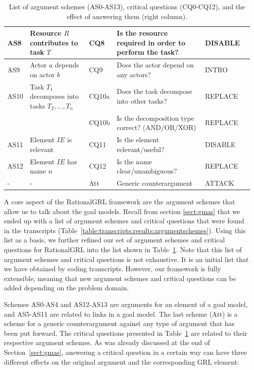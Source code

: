 \begin{table}[t]
\begin{tabularx}{\textwidth}{|l|l|l|X|l|l|}
\hline
AS8 & Resource $R$ contributes to task $T$ & CQ8 & Is the resource required in order to perform the task?& DISABLE\\
\hline
AS9 & Actor $a$ depends on actor $b$ & CQ9 & Does the actor depend on any actors?& INTRO\\
\hline
AS10 & Task $T_1$ decomposes into tasks $T_2,\ldots,T_n$ & CQ10a & Does the task decompose into other tasks?& REPLACE\\
 &  & CQ10b & Is the decomposition type correct? (AND/OR/XOR)& REPLACE\\
\hline
AS11 & Element $IE$ is relevant & CQ11 & Is the element relevant/useful? & DISABLE\\
\hline
AS12 & Element $IE$ has name $n$ & CQ12 & Is the name clear/unambiguous? & REPLACE\\
\hline
\hline
- & - & Att & Generic counterargument & ATTACK\\
\hline
\end{tabularx}
\caption{List of argument schemes (AS0-AS13), critical questions (CQ0-CQ12), and the effect of answering them (right column).}
\label{table:argument-schemes}
\end{table}

A core aspect of the RationalGRL framework are the argument schemes that allow us to talk about the goal models. Recall from section \ref{sect:gmas} that we ended up with a list of argument schemes and critical questions that were found in the transcripts (Table~\ref{table:transcripts:results:argumentschemes}). Using this list as a basis, we further refined our set of argument schemes and critical questions for RationalGRL into the list shown in Table~\ref{table:argument-schemes}. Note that this list of argument schemes and critical questions is not exhaustive. It is an initial list that we have obtained by coding transcripts. However, our framework is fully extensible, meaning that new argument schemes and critical questions can be added depending on the problem domain.

Schemes AS0-AS4 and AS12-AS13 are arguments for an element of a goal model, and AS5-AS11 are related to links in a goal model. The last scheme (Att) is a scheme for a generic counterargument against any type of argument that has been put forward. The critical questions presented in Table~\ref{table:argument-schemes} are related to their respective argument schemes. As was already discussed at the end of Section~\ref{sect:gmas}, answering a critical question in a certain way can have three different effects on the original argument and the corresponding GRL element:

